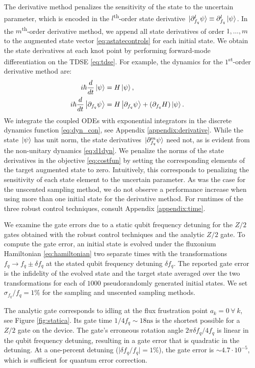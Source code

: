 The derivative method penalizes the sensitivity of the state
to the uncertain parameter, which is encoded in the $l$\textsuperscript{th}-order
state derivative $\ket*{\partial_{f_{q}}^{l} \psi} \equiv \partial_{f_{q}}^{l} \ket*{\psi}$.
In the $m$\textsuperscript{th}-order
derivative method, we append all state derivatives of order $1, \dots, m$
to the augmented state vector \eqref{eq:astatecontrols}
for each initial state.
We obtain the state derivatives at each knot point by performing forward-mode
differentiation on the TDSE \eqref{eq:tdse}.
For example, the dynamics for the $1$\textsuperscript{st}-order derivative method are:
\begin{align}
  i \hbar \frac{d}{dt} \ket{\psi} &= H \ket{\psi},\\
  i \hbar \frac{d}{dt} \ket{\partial_{f_{q}}\psi} &=
  H \ket{\partial_{f_{q}} \psi} +
  (\partial_{f_{q}} H) \ket{\psi}.
  \label{eq:d1dyn}
\end{align}
We integrate the coupled ODEs with exponential
integrators in the discrete dynamics function \eqref{eq:dyn_con},
see Appendix \ref{appendix:derivative}.
While the state $\ket*{\psi}$ has unit norm,
the state derivatives $\ket*{\partial^{m}_{f_{q}} \psi}$ need not, as is evident
from the non-unitary dynamics \eqref{eq:d1dyn}.
We penalize the norms of the state derivatives
in the objective \eqref{eq:costfun} by setting the corresponding elements
of the target augmented state to zero. Intuitively, this corresponds to penalizing
the sensitivity of each state element to the uncertain parameter. As was the case for
the unscented sampling
method, we do not observe a performance increase when using more than one initial state
for the derivative method.
For runtimes of the three robust control techniques,
consult Appendix \ref{appendix:time}.

We examine the gate errors due to a static qubit frequency
detuning for the $Z/2$ gates obtained with the robust control techniques
and the analytic $Z/2$ gate.
To compute the gate error,
an initial state is evolved
under the fluxonium Hamiltonian \eqref{eq:hamiltonian}
two separate times with the transformations
$f_{q} \rightarrow f_{q} \pm \delta f_{q}$
at the stated qubit frequency detuning $\delta f_{q}$.
The reported gate error is the infidelity of
the evolved state and the target state averaged over
the two transformations for each of $1000$ pseudorandomly
generated initial states.
We set $\sigma_{f_{q}}/f_{q} = 1\%$
for the sampling and unscented sampling
methods.

The analytic gate corresponds to
idling at the flux frustration point $a_{k} = 0 \ \forall \ k$, see Figure
\ref{fig:statica}. Its gate time $1 / 4 f_{q} \sim 18\textrm{ns}$
is the shortest possible for a $Z/2$ gate on the device.
The gate's erroneous rotation angle
$2 \pi \delta f_{q} / 4 f_{q}$ is linear in the
qubit frequency detuning, resulting in a gate error that is quadratic
in the detuning.
At a one-percent detuning ($\lvert \delta f_{q} / f_{q} \rvert = 1\%$),
the gate error is $\sim 4.7 \cdot 10^{-5}$,
which is sufficient for quantum error correction.

